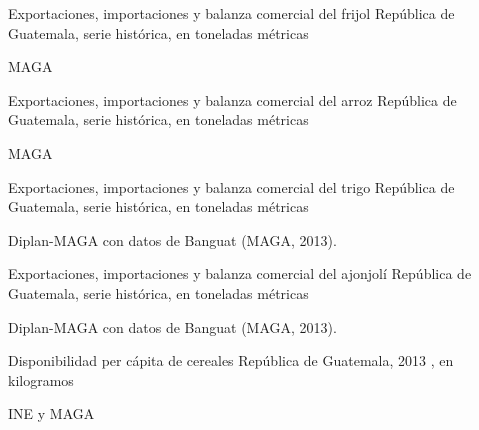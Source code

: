 
%
{%
}%
{%
	Exportaciones, importaciones y balanza comercial del frijol} %
{%
	República de Guatemala, serie histórica, en toneladas métricas } %
{%
	\begin{tikzpicture}[x=1pt,y=1pt]    \end{tikzpicture}}%
{%
	MAGA} %



%
{%
}%
{%
	Exportaciones, importaciones y balanza comercial del arroz} %
{%
	República de Guatemala, serie histórica, en toneladas métricas } %
{%
	\begin{tikzpicture}[x=1pt,y=1pt]    \end{tikzpicture}}%
{%
	MAGA} %


%
{%
}%
{%
	Exportaciones, importaciones y balanza comercial del trigo} %
{%
	República de Guatemala, serie histórica, en toneladas métricas } %
{%
	\begin{tikzpicture}[x=1pt,y=1pt]    \end{tikzpicture}}%
{%
	Diplan-MAGA con datos de Banguat (MAGA, 2013).} %


%
{%
}%
{%
	Exportaciones, importaciones y balanza comercial del ajonjolí} %
{%
	República de Guatemala, serie histórica, en toneladas métricas } %
{%
	\begin{tikzpicture}[x=1pt,y=1pt]    \end{tikzpicture}}%
{%
	Diplan-MAGA con datos de Banguat (MAGA, 2013).} %


%
{%
}%
{%
	Disponibilidad per cápita de cereales } %
{%
	República de Guatemala, 2013 , en kilogramos } %
{%
	\begin{tikzpicture}[x=1pt,y=1pt]    \end{tikzpicture}}%
{%
	INE y MAGA} %


